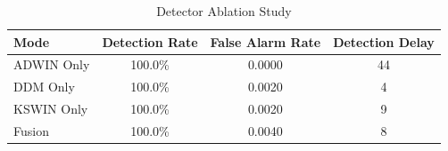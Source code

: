 \begin{table}[htbp]
\caption{Detector Ablation Study}
\label{tab:detector_ablation}
\centering
\begin{tabular}{@{}lccc@{}}
\toprule
\textbf{Mode} & \textbf{Detection Rate} & \textbf{False Alarm Rate} & \textbf{Detection Delay} \\ \midrule
ADWIN Only & 100.0\% & 0.0000 & 44 \\
DDM Only & 100.0\% & 0.0020 & 4 \\
KSWIN Only & 100.0\% & 0.0020 & 9 \\
Fusion & 100.0\% & 0.0040 & 8 \\
\bottomrule
\end{tabular}
\end{table}
